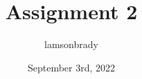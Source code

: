 \usepackage[utf8]{inputenc}

\title{Assignment 2}
\author{lamsonbrady }
\date{September 3rd, 2022}

\usepackage{parskip}

\usepackage{fancyhdr}
\pagestyle{fancy}

\usepackage{amsmath}
\usepackage{amssymb}

\newcommand{\psmall}[1]{
	\left(\begin{smallmatrix}
		#1
	\end{smallmatrix} \right)
}

\newcommand{\genericmat}[2]{
	\ensuremath{
		\begin{#1matrix}
			#2
		\end{#1matrix}
	}
}

\newcommand{\genericvec}{
	\ensuremath{
		\left\{\vec{e_1}, \vec{e_2}, \dots, \vec{e_n} \right\}
	}
}

\newcommand{\bb}{\mathbb}
\newcommand{\R}{\mathbb{R}}
\renewcommand{\P}{\mathbb{P}}
\newcommand{\Z}{\mathbb{Z}}

